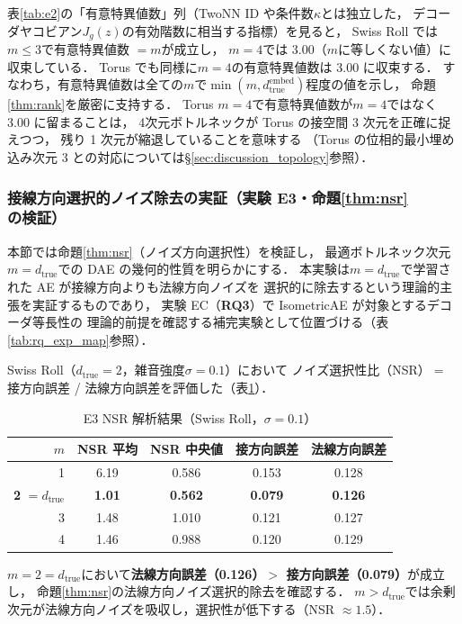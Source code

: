 \documentclass[12pt,a4paper]{jsarticle}
\newcommand{\dtrue}{d_{\mathrm{true}}}
\newcommand{\Jg}{J_g}
\newcommand{\kap}{\kappa}
\begin{document}
表\ref{tab:e2}の「有意特異値数」列（TwoNN ID や条件数$\kap$とは独立した，
デコーダヤコビアン$\Jg(z)$の有効階数に相当する指標）を見ると，
Swiss Roll では$m \leq 3$で有意特異値数 $= m$が成立し，
$m=4$では 3.00（$m$に等しくない値）に収束している．
Torus でも同様に$m=4$の有意特異値数は 3.00 に収束する．
すなわち，有意特異値数は全ての$m$で$\min(m, \dtrue^{\text{embed}})$程度の値を示し，
命題\ref{thm:rank}を厳密に支持する．
Torus $m=4$で有意特異値数が$m=4$ではなく 3.00 に留まることは，
4次元ボトルネックが Torus の接空間 3 次元を正確に捉えつつ，
残り 1 次元が縮退していることを意味する
（Torus の位相的最小埋め込み次元 3 との対応については§\ref{sec:discussion_topology}参照）．

\subsubsection{接線方向選択的ノイズ除去の実証（実験 E3・命題\ref{thm:nsr}の検証）}

本節では命題\ref{thm:nsr}（ノイズ方向選択性）を検証し，
最適ボトルネック次元$m = \dtrue$での DAE の幾何的性質を明らかにする．
本実験は$m = \dtrue$で学習された AE が接線方向よりも法線方向ノイズを
選択的に除去するという理論的主張を実証するものであり，
実験 EC（\textbf{RQ3}）で IsometricAE が対象とするデコーダ等長性の
理論的前提を確認する補完実験として位置づける（表\ref{tab:rq_exp_map}参照）．

Swiss Roll（$\dtrue = 2$，雑音強度$\sigma = 0.1$）において
ノイズ選択性比（NSR）$=$ 接方向誤差 / 法線方向誤差を評価した（表\ref{tab:e3}）．

\begin{table}[H]
\centering
\caption{E3 NSR 解析結果（Swiss Roll，$\sigma = 0.1$）}
\label{tab:e3}
\begin{tabular}{rcccc}
\toprule
$m$ & NSR 平均 & NSR 中央値 & 接方向誤差 & 法線方向誤差 \\
\midrule
1 & 6.19 & 0.586 & 0.153 & 0.128 \\
\textbf{2} $= \dtrue$ & \textbf{1.01} & \textbf{0.562} & \textbf{0.079} & \textbf{0.126} \\
3 & 1.48 & 1.010 & 0.121 & 0.127 \\
4 & 1.46 & 0.988 & 0.120 & 0.129 \\
\bottomrule
\end{tabular}
\end{table}

$m = 2 = \dtrue$において\textbf{法線方向誤差（0.126）$>$ 接方向誤差（0.079）}が成立し，
命題\ref{thm:nsr}の法線方向ノイズ選択的除去を確認する．
$m > \dtrue$では余剰次元が法線方向ノイズを吸収し，選択性が低下する（NSR $\approx 1.5$）．
\end{document}
